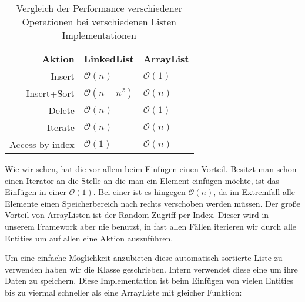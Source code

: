 \begin{table}[h]
\begin{tabular}{|r|l|l|}
\hline
Aktion          & LinkedList             & ArrayList        \\ \hline
Insert          & $ \mathcal O(n)       $ & $ \mathcal O(1) $ \\ \hline
Insert+Sort     & $ \mathcal O(n + n^2) $ & $ \mathcal O(n) $ \\ \hline
Delete          & $ \mathcal O(n)       $ & $ \mathcal O(1) $ \\ \hline
Iterate         & $ \mathcal O(n)       $ & $ \mathcal O(n) $ \\ \hline
Access by index & $ \mathcal O(1)       $ & $ \mathcal O(n) $ \\ \hline
\end{tabular}
\caption{Vergleich der Performance verschiedener Operationen bei verschiedenen Listen Implementationen}
\end{table} %

Wie wir sehen, hat die  vor allem beim Einfügen  einen Vorteil. Besitzt man schon einen Iterator an die Stelle an die man ein Element einfügen möchte, ist das Einfügen in einer  $\mathcal O(1)$. Bei einer  ist es hingegen $\mathcal O(n)$, da im Extremfall alle Elemente einen Speicherbereich nach rechts verschoben werden müssen.
Der große Vorteil von ArrayListen ist der Random-Zugriff per Index. Dieser wird in unserem Framework aber nie benutzt, in fast allen Fällen iterieren wir durch alle Entities um auf allen eine Aktion auszuführen.

Um eine einfache Möglichkeit anzubieten diese automatisch sortierte Liste zu verwenden haben wir die Klasse  geschrieben. Intern verwendet diese eine  um ihre Daten zu speichern. Diese Implementation ist beim Einfügen von vielen Entities bis zu viermal schneller als eine ArrayListe mit gleicher Funktion:

